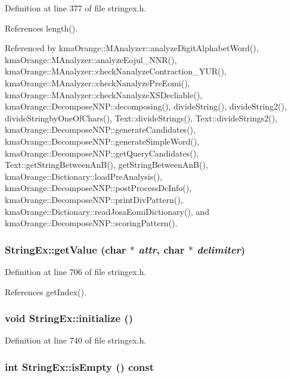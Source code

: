 Definition at line 377 of file stringex.h.

References length().

Referenced by kmaOrange::MAnalyzer::analyzeDigitAlphabetWord(), kmaOrange::MAnalyzer::analyzeEojul\_\-NNR(), kmaOrange::MAnalyzer::checkNanalyzeContraction\_\-YUR(), kmaOrange::MAnalyzer::checkNanalyzePreEomi(), kmaOrange::MAnalyzer::checkNanalyzeXSDecliable(), kmaOrange::DecomposeNNP::decomposing(), divideString(), divideString2(), divideStringbyOneOfChars(), Text::divideStrings(), Text::divideStrings2(), kmaOrange::DecomposeNNP::generateCandidates(), kmaOrange::DecomposeNNP::generateSimpleWord(), kmaOrange::DecomposeNNP::getQueryCandidates(), Text::getStringBetweenAnB(), getStringBetweenAnB(), kmaOrange::Dictionary::loadPreAnalysis(), kmaOrange::DecomposeNNP::postProcessDcInfo(), kmaOrange::DecomposeNNP::printDivPattern(), kmaOrange::Dictionary::readJosaEomiDictionary(), and kmaOrange::DecomposeNNP::scoringPattern().\hypertarget{classStringEx_b78db0441abdf6a0f5d57aaba69df789}{
\subsubsection[{getValue}]{ StringEx::getValue (char $\ast$ {\em attr}, \/  char $\ast$ {\em delimiter})}}
\label{classStringEx_b78db0441abdf6a0f5d57aaba69df789}




Definition at line 706 of file stringex.h.

References getIndex().\hypertarget{classStringEx_4fc92209cf4427f463558800800c3647}{
\subsubsection[{initialize}]{\setlength{\rightskip}{0pt plus 5cm}void StringEx::initialize ()}}
\label{classStringEx_4fc92209cf4427f463558800800c3647}




Definition at line 740 of file stringex.h.\hypertarget{classStringEx_88e19f0888814f720ef6b1bbec459ded}{
\subsubsection[{isEmpty}]{\setlength{\rightskip}{0pt plus 5cm}int StringEx::isEmpty () const}}
\label{classStringEx_88e19f0888814f720ef6b1bbec459ded}




